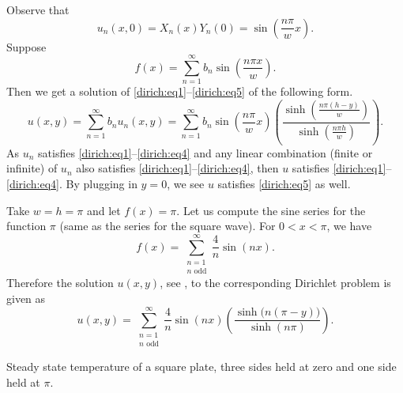 \documentclass{ximera}
\begin{document}
Observe that
\begin{equation*}
    u_n(x,0) = X_n(x)Y_n(0) = \sin \left( \frac{n \pi}{w} x \right) .
\end{equation*}
Suppose
\begin{equation*}
    f(x) =
    \sum_{n=1}^\infty
    b_n \sin \left( \frac{n \pi x }{w} \right) .
\end{equation*}
Then we get a solution of \eqref{dirich:eq1}--\eqref{dirich:eq5} of the following form.
\begin{equation*}
    u(x,y) = \sum_{n=1}^\infty
    b_n u_n(x,y) = \sum_{n=1}^\infty
    b_n \sin \left( \frac{n \pi}{w} x \right)\left( \frac{\sinh \left( \frac{n \pi (h-y) }{w} \right)}%
    {\sinh \left( \frac{n \pi h }{w} \right)} \right).
\end{equation*}
As $u_n$ satisfies \eqref{dirich:eq1}--\eqref{dirich:eq4} and any linear combination (finite or infinite) of $u_n$ also satisfies  \eqref{dirich:eq1}--\eqref{dirich:eq4}, then $u$ satisfies \eqref{dirich:eq1}--\eqref{dirich:eq4}. By plugging in $y=0$, we see $u$ satisfies \eqref{dirich:eq5} as well.

\begin{example}
    Take $w=h=\pi$ and let $f(x) = \pi$.  Let us compute the sine series for the function $\pi$ (same as the series for the square wave). For $0 < x < \pi$, we have
    \begin{equation*}
        f(x) = \sum_{\substack{n=1 \\ n \text{ odd}}}^\infty \frac{4}{n} \sin (n x) .
    \end{equation*}
    Therefore the solution $u(x,y)$, see , to the corresponding Dirichlet problem is given as
    \begin{equation*}
        u(x,y) = \sum_{\substack{n=1 \\ n \text{ odd}}}^\infty \frac{4}{n} \sin (n x) \left( \frac{\sinh \bigl( n (\pi-y) \bigr) }{\sinh (n \pi)} \right).
    \end{equation*}
    
    \begin{myfig}
        \capstart
        \caption{Steady state temperature of a square plate, three sides held at zero and one side held at $\pi$.\label{dirichsquareplot:fig}}
    \end{myfig}
\end{example}
\end{document}
